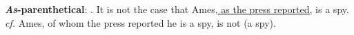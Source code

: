 \noindent\parbox[b]{\textwidth}{\textbf{\textit{As}-parenthetical}:
\ex. It is not the case that Ames\underline{, as the press reported,} is a spy.\\
\textit{cf.} Ames, of whom the press reported he is a spy, is not (a spy).\\

}
%
%
